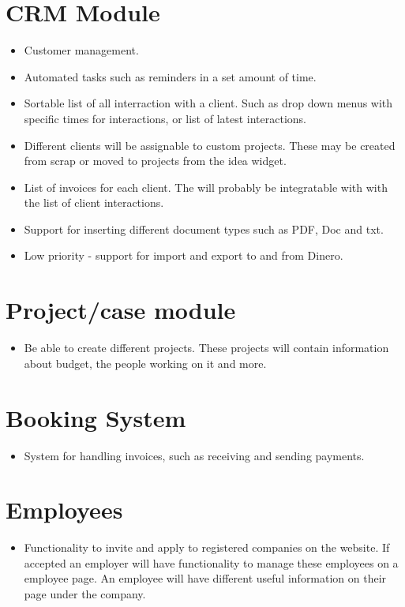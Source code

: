 \section{CRM Module}
\begin{itemize}
	\item Customer management.
	\item Automated tasks such as reminders in a set amount of time. 
	\item Sortable list of all interraction with a client. Such as drop down menus with specific times for interactions, or list of latest interactions.
	\item Different clients will be assignable to custom projects. These may be created from scrap or moved to projects from the idea widget.
	\item List of invoices for each client. The will probably be integratable with with the list of client interactions.
	\item Support for inserting different document types such as PDF, Doc and txt.
	\item Low priority - support for import and export to and from Dinero. 
\end{itemize}

\section{Project/case module}
\begin{itemize}
	\item Be able to create different projects. These projects will contain information about budget, the people working on it and more.
\end{itemize}

\section{Booking System}
\begin{itemize}
	\item System for handling invoices, such as receiving and sending payments.
\end{itemize}

\section{Employees}
\begin{itemize}
	\item Functionality to invite and apply to registered companies on the website. If accepted an employer will have functionality to manage these employees on a employee page. An employee will have different useful information on their page under the company.
\end{itemize}

